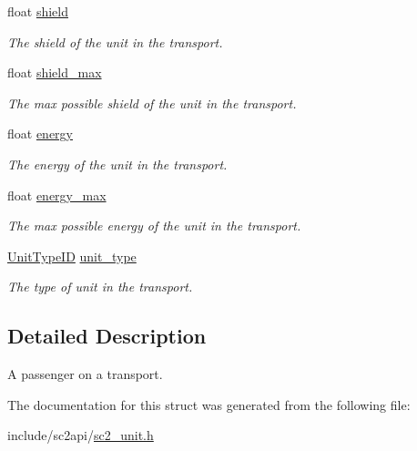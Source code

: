 \begin{DoxyCompactItemize}
float \hyperlink{structsc2_1_1_passenger_unit_a8e79587e7907106cde23a76e2db4d1fd}{shield}
\begin{DoxyCompactList}\small\item\em The shield of the unit in the transport. \end{DoxyCompactList}\item 
\mbox{\label{structsc2_1_1_passenger_unit_a5042ae0895025e2d4cced740b8c28571}} 
float \hyperlink{structsc2_1_1_passenger_unit_a5042ae0895025e2d4cced740b8c28571}{shield\+\_\+max}
\begin{DoxyCompactList}\small\item\em The max possible shield of the unit in the transport. \end{DoxyCompactList}\item 
\mbox{\label{structsc2_1_1_passenger_unit_a1efad4d291286d5d8a7591fa4c12af4f}} 
float \hyperlink{structsc2_1_1_passenger_unit_a1efad4d291286d5d8a7591fa4c12af4f}{energy}
\begin{DoxyCompactList}\small\item\em The energy of the unit in the transport. \end{DoxyCompactList}\item 
\mbox{\label{structsc2_1_1_passenger_unit_a9439fcc4557d238c254ba3b4c4329e5c}} 
float \hyperlink{structsc2_1_1_passenger_unit_a9439fcc4557d238c254ba3b4c4329e5c}{energy\+\_\+max}
\begin{DoxyCompactList}\small\item\em The max possible energy of the unit in the transport. \end{DoxyCompactList}\item 
\mbox{\label{structsc2_1_1_passenger_unit_a84f5da3c8a6c163f3b1eb5f0061e5d7e}} 
\hyperlink{classsc2_1_1_s_c2_type}{Unit\+Type\+ID} \hyperlink{structsc2_1_1_passenger_unit_a84f5da3c8a6c163f3b1eb5f0061e5d7e}{unit\+\_\+type}
\begin{DoxyCompactList}\small\item\em The type of unit in the transport. \end{DoxyCompactList}\end{DoxyCompactItemize}


\subsection{Detailed Description}
A passenger on a transport. 

The documentation for this struct was generated from the following file\+:\begin{DoxyCompactItemize}
\item 
include/sc2api/\hyperlink{sc2__unit_8h}{sc2\+\_\+unit.\+h}\end{DoxyCompactItemize}
